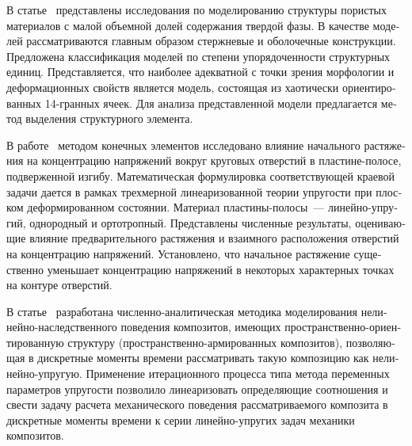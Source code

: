 \begin{russian}
В статье~\cite{Chernous} представлены исследования по моделированию структуры пористых материалов с малой объемной долей содержания твердой фазы. В качестве моделей рассматриваются главным образом стержневые и оболочечные конструкции. Предложена классификация моделей по степени упорядоченности структурных единиц. Представляется, что наиболее адекватной с точки зрения морфологии и деформационных свойств является модель, состоящая из хаотически ориентированных 14-гранных ячеек. Для анализа представленной модели предлагается метод выделения структурного элемента.

В работе~\cite{Akbarov} методом конечных элементов исследовано влияние начального растяжения на концентрацию напряжений вокруг круговых отверстий в пластине-полосе, подверженной изгибу. Математическая формулировка соответствующей краевой задачи дается в рамках трехмерной линеаризованной теории упругости при плоском деформированном состоянии. Материал пластины-полосы~--- линейно-упругий, однородный и ортотропный. Представлены численные результаты, оценивающие влияние предварительного растяжения и взаимного расположения отверстий на концентрацию напряжений. Установлено, что начальное растяжение существенно уменьшает концентрацию напряжений в некоторых характерных точках на контуре отверстий.

В статье~\cite{Yankovskiy} разработана численно-аналитическая методика моделирования нелинейно-наследственного поведения композитов, имеющих про\-стран\-ст\-ве\-н\-но-ори\-ен\-ти\-ро\-ва\-н\-ную структуру (пространственно-армированных композитов), позволяющая в дискретные моменты времени рассматривать такую композицию как не\-ли\-ней\-но-уп\-ру\-гую. Применение итерационного процесса типа метода переменных параметров упругости позволило линеаризовать определяющие соотношения и свести задачу расчета механического поведения рассматриваемого композита в дискретные моменты времени к серии ли\-ней\-но-уп\-ру\-гих задач механики композитов. 


\end{russian}
